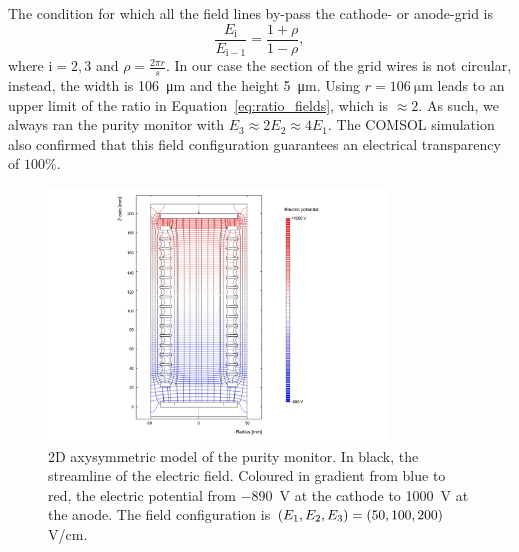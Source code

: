 \documentclass[a4paper,11pt]{article}
\begin{document}
The condition for which all the field lines by-pass the cathode- or anode-grid is
\begin{equation}
    \frac{E_\mathrm{i}}{E_{\mathrm{i}-1}} = \frac{1+\rho}{1-\rho},
    \label{eq:ratio_fields}
\end{equation}
where $\mathrm{i} = 2,3$ and $\rho = \frac{2\pi r}{s}$. 
In our case the section of the grid wires is not circular, instead, the width is \SI{106}{\micro\metre} and the height \SI{5}{\micro\metre}. Using $r=\SI{106}{\micro\metre}$ leads to an upper limit of the ratio in Equation~\ref{eq:ratio_fields}, which is $\approx 2$. As such, we always ran the purity monitor with $E_3\approx 2 E_2 \approx 4 E_1$. The COMSOL simulation also confirmed that this field configuration guarantees an electrical transparency of $100\%$. 

\begin{figure}
	\begin{center}
	\includegraphics[width=0.8\textwidth, trim={0 0cm 0cm 0cm}, clip=true]{figures/COMSOLsim.png}	
	\caption{2D axysymmetric model of the purity monitor. In black, the streamline of the electric field. Coloured in gradient from blue to red, the electric potential from \SI{-890}{\volt} at the cathode to \SI{1000}{\volt} at the anode. The field configuration is $\protect (E_1, E_2, E_3) = (50, 100, 200)$\;V/cm.}
	\label{fig:Comsol}
	\end{center}
\end{figure}
\end{document}
